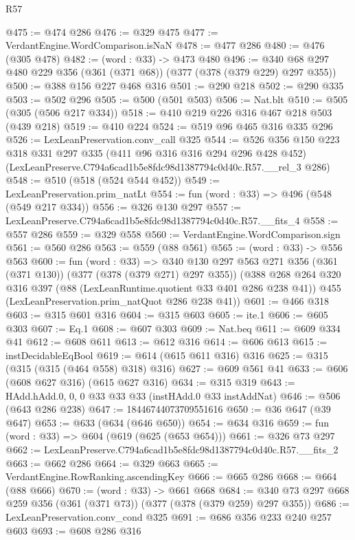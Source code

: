 \begin{lexlean}{R57}
\begin{coremodule}
@475 := @474 @286
@476 := @329 @475
@477 := VerdantEngine.WordComparison.isNaN
@478 := @477 @286
@480 := @476 (@305 @478)
@482 := (word : @33) -> @473 @480
@496 := @340 @68 @297 @480 @229 @356 (@361 (@371 @68)) (@377 (@378 (@379 @229) @297 @355))
@500 := @388 @156 @227 @468 @316
@501 := @290 @218
@502 := @290 @335
@503 := @502 @296
@505 := @500 (@501 @503)
@506 := Nat.blt
@510 := @505 (@305 (@506 @217 @334))
@518 := @410 @219 @226 @316 @467 @218 @503 (@439 @218)
@519 := @410 @224
@524 := @519 @96 @465 @316 @335 @296
@526 := LexLeanPreservation.conv_call @325
@544 := @526
    @356
    @150
    @223
    @318
    @331
    @297
    @335
    (@411 @96 @316 @316 @294 @296 @428 @452)
    (LexLeanPreserve.C794a6cad1b5e8fdc98d1387794c0d40c.R57.__rel_3 @286)
@548 := @510 (@518 (@524 @544 @452))
@549 := LexLeanPreservation.prim_natLt
@554 := fun (word : @33) => @496 (@548 (@549 @217 @334))
@556 := @326 @130 @297
@557 := LexLeanPreserve.C794a6cad1b5e8fdc98d1387794c0d40c.R57.__fits_4
@558 := @557 @286
@559 := @329 @558
@560 := VerdantEngine.WordComparison.sign
@561 := @560 @286
@563 := @559 (@88 @561)
@565 := (word : @33) -> @556 @563
@600 := fun (word : @33) =>
  @340
    @130
    @297
    @563
    @271
    @356
    (@361 (@371 @130))
    (@377 (@378 (@379 @271) @297 @355))
    (@388
      @268
      @264
      @320
      @316
      @397
      (@88 (LexLeanRuntime.quotient @33 @401 @286 @238 @41))
      @455
      (LexLeanPreservation.prim_natQuot @286 @238 @41))
@601 := @466 @318
@603 := @315 @601 @316
@604 := @315 @603
@605 := ite.{1}
@606 := @605 @303
@607 := Eq.{1}
@608 := @607 @303
@609 := Nat.beq
@611 := @609 @334 @41
@612 := @608 @611
@613 := @612 @316
@614 := @606 @613
@615 := instDecidableEqBool
@619 := @614 (@615 @611 @316) @316
@625 := @315 (@315 (@315 (@464 @558) @318) @316)
@627 := @609 @561 @41
@633 := @606 (@608 @627 @316) (@615 @627 @316)
@634 := @315 @319
@643 := HAdd.hAdd.{0, 0, 0} @33 @33 @33 (instHAdd.{0} @33 instAddNat)
@646 := @506 (@643 @286 @238)
@647 := 18446744073709551616
@650 := @36 @647 (@39 @647)
@653 := @633 (@634 (@646 @650))
@654 := @634 @316
@659 := fun (word : @33) => @604 (@619 (@625 (@653 @654)))
@661 := @326 @73 @297
@662 := LexLeanPreserve.C794a6cad1b5e8fdc98d1387794c0d40c.R57.__fits_2
@663 := @662 @286
@664 := @329 @663
@665 := VerdantEngine.RowRanking.ascendingKey
@666 := @665 @286
@668 := @664 (@88 @666)
@670 := (word : @33) -> @661 @668
@684 := @340 @73 @297 @668 @259 @356 (@361 (@371 @73)) (@377 (@378 (@379 @259) @297 @355))
@686 := LexLeanPreservation.conv_cond @325
@691 := @686 @356 @233 @240 @257 @603
@693 := @608 @286 @316

\end{coremodule}
\end{lexlean}
